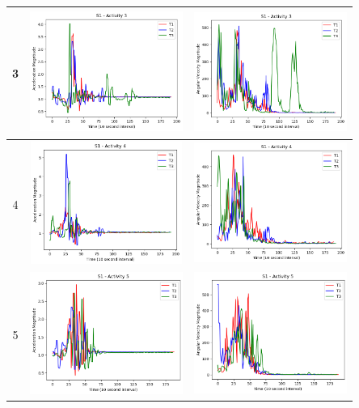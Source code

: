 \documentclass{llncs}
\begin{document}
\begin{table}
\begin{center}
\begin{tabular}{|c|c|c|}
			3 & \includegraphics[width=5cm, height=4cm]{images/Acceleration/S1_Activity3.png} & \includegraphics[width=5cm, height=4cm]{images/AngularVelocity/S1_Activity3.png}\\
			\midrule
			4 & \includegraphics[width=5cm, height=4cm]{images/Acceleration/S1_Activity4.png} & \includegraphics[width=5cm, height=4cm]{images/AngularVelocity/S1_Activity4.png}\\
			\midrule
			5 & \includegraphics[width=5cm, height=4cm]{images/Acceleration/S1_Activity5.png} & \includegraphics[width=5cm, height=4cm]{images/AngularVelocity/S1_Activity5.png}\\

\end{tabular}
\end{center}
\end{table}
\end{document}
